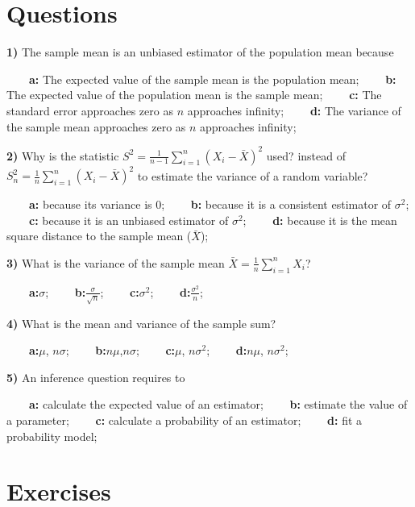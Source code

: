 \documentclass[
]{book}
\begin{document}
\hypertarget{questions-7}{%
\section{Questions}\label{questions-7}}

\textbf{1)} The sample mean is an unbiased estimator of the population mean because

\textbf{\(\qquad\)a:} The expected value of the sample mean is the population mean;
\textbf{\(\qquad\)b:} The expected value of the population mean is the sample mean;
\textbf{\(\qquad\)c:} The standard error approaches zero as \(n\) approaches infinity;
\textbf{\(\qquad\)d:} The variance of the sample mean approaches zero as \(n\) approaches infinity;

\textbf{2)} Why is the statistic \(S^2=\frac{1}{n-1}\sum_{i=1}^{n}(X_i -\bar{X})^2\) used? instead of \(S_n^2=\frac{1}{n}\sum_{i=1}^{n}(X_i -\bar{X})^2\) to estimate the variance of a random variable?

\textbf{\(\qquad\)a:} because its variance is \(0\);
\textbf{\(\qquad\)b:} because it is a consistent estimator of \(\sigma^2\);
\textbf{\(\qquad\)c:} because it is an unbiased estimator of \(\sigma^2\);
\textbf{\(\qquad\)d:} because it is the mean square distance to the sample mean (\(\bar{X}\));

\textbf{3)} What is the variance of the sample mean \(\bar{X}=\frac{1}{n}\sum_{i=1}^n X_i\)?

\textbf{\(\qquad\)a:}\(\sigma\);
\textbf{\(\qquad\)b:}\(\frac{\sigma}{\sqrt{n}}\);
\textbf{\(\qquad\)c:}\(\sigma^2\);
\textbf{\(\qquad\)d:}\(\frac{\sigma^2}{n}\);

\textbf{4)} What is the mean and variance of the sample sum?

\textbf{\(\qquad\)a:}\(\mu\), \(n\sigma\);
\textbf{\(\qquad\)b:}\(n\mu\),\(n\sigma\);
\textbf{\(\qquad\)c:}\(\mu\), \(n\sigma^2\);
\textbf{\(\qquad\)d:}\(n\mu\), \(n\sigma^2\);

\textbf{5)} An inference question requires to

\textbf{\(\qquad\)a:} calculate the expected value of an estimator;
\textbf{\(\qquad\)b:} estimate the value of a parameter;
\textbf{\(\qquad\)c:} calculate a probability of an estimator;
\textbf{\(\qquad\)d:} fit a probability model;

\hypertarget{exercises-8}{%
\section{Exercises}\label{exercises-8}}
\end{document}
